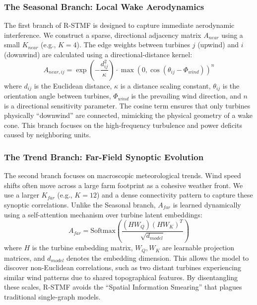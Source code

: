 \subsubsection{The Seasonal Branch: Local Wake Aerodynamics}
\label{sec:rstmf_seasonal}
The first branch of R-STMF is designed to capture immediate aerodynamic interference. We construct a sparse, directional adjacency matrix $A_{near}$ using a small $K_{near}$ (e.g., $K=4$). The edge weights between turbines $j$ (upwind) and $i$ (downwind) are calculated using a directional-distance kernel:
\begin{equation}
A_{near, ij} = \exp\left( -\frac{d_{ij}^2}{\kappa} \right) \cdot \max(0, \cos(\theta_{ij} - \Phi_{wind}))^n
\end{equation}
where $d_{ij}$ is the Euclidean distance, $\kappa$ is a distance scaling constant, $\theta_{ij}$ is the orientation angle between turbines, $\Phi_{wind}$ is the prevailing wind direction, and $n$ is a directional sensitivity parameter. The cosine term ensures that only turbines physically ``downwind'' are connected, mimicking the physical geometry of a wake cone. This branch focuses on the high-frequency turbulence and power deficits caused by neighboring units.

\subsubsection{The Trend Branch: Far-Field Synoptic Evolution}
\label{sec:rstmf_trend}
The second branch focuses on macroscopic meteorological trends. Wind speed shifts often move across a large farm footprint as a cohesive weather front. We use a larger $K_{far}$ (e.g., $K=12$) and a dense connectivity pattern to capture these synoptic correlations. Unlike the Seasonal branch, $A_{far}$ is learned dynamically using a self-attention mechanism over turbine latent embeddings:
\begin{equation}
A_{far} = \text{Softmax}\left( \frac{(H W_Q) (H W_K)^T}{\sqrt{d_{model}}} \right)
\end{equation}
where $H$ is the turbine embedding matrix, $W_Q, W_K$ are learnable projection matrices, and $d_{model}$ denotes the embedding dimension. This allows the model to discover non-Euclidean correlations, such as two distant turbines experiencing similar wind patterns due to shared topographical features. By disentangling these scales, R-STMF avoids the ``Spatial Information Smearing'' that plagues traditional single-graph models.

